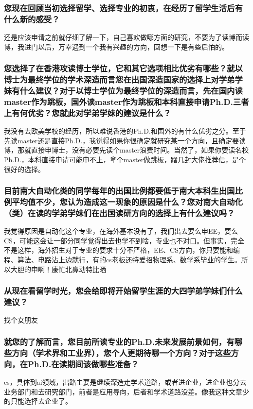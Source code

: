 \documentclass[a4paper,UTF8]{book}
\begin{document}
    \subsubsection*{您现在回顾当初选择留学、选择专业的初衷，在经历了留学生活后有什么新的感受？}
    还是应该申请之前就仔细了解一下，自己喜欢做哪方面的研究，不要为了读博而读博，我进门以后，万幸遇到一个我有兴趣的方向，回想一下是有些后怕的。
    \subsubsection*{您选择了在香港攻读博士学位，它和其它选项相比优劣有哪些？就以博士为最终学位的学术深造而言您在出国深造国家的选择上对学弟学妹有什么建议？对于以博士学位为最终学位的深造而言，先在国内读master作为跳板，国外读master作为跳板和本科直接申请Ph.D.三者上有何优劣？您就此对学弟学妹的建议是什么？}
    我没有去欧美学校的经历，所以难说香港的Ph.D.和国外的有什么优劣之分。至于先读master还是直接Ph.D.，我觉得如果你很确定就研究某一个方向，且确定要读博，那就直接申博士，没有必要先读个master浪费时间。当然了，如果你要读名校Ph.D.，本科直接申请可能申不上，拿个master做跳板，蹭几封大佬推荐信，是个很好的选择。

    \subsubsection*{目前南大自动化类的同学每年的出国比例都要低于南大本科生出国比例平均值不少，您认为造成这一现象的原因是什么？您对南大自动化（类）在读的学弟学妹们在出国读研方向的选择上有什么建议吗？}
    我觉得原因是自动化这个专业，在海外基本没有了，我们出去要么申EE，要么CS，可能这会让一部分同学觉得出去也学不到啥，专业也不对口。但事实，完全不是这样，海外招生对于专业的要求十分不严格，EE、CS方向，你只要能和编程、算法、电路沾上边就行，有的cs老板还特爱招物理系、数学系毕业的学生。所以大胆的申啊！康忙北鼻动特比晒
    \subsubsection*{从现在看留学时光，您会给即将开始留学生涯的大四学弟学妹们什么建议？}
    找个女朋友
    \subsubsection*{就您的了解而言，您目前所读专业的Ph.D.未来发展前景如何，有哪些方向（学术界和工业界），您个人更期待哪一个方向？对于这些方向，在Ph.D.在读期间该做哪些准备？}
    cs，具体到ai领域，出路主要是继续深造走学术道路，或者进企业，进企业也分去业务部门和去研究部门，前者是应用导向，后者和学术道路没差。像我这种文章少的只能选择去企业了。
\end{document}
